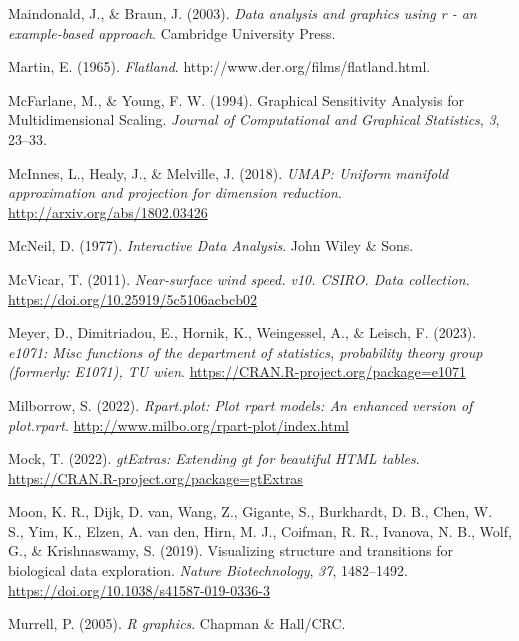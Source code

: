 \documentclass[
  letterpaper,
]{book}
\newlength{\cslhangindent}
\newlength{\cslentryspacingunit} %
\newenvironment{CSLReferences}[2] %
 {%
  \setlength{\parindent}{0pt}
  \ifodd #1
  \let\oldpar\par
  \def\par{\hangindent=\cslhangindent\oldpar}
  \fi
  \setlength{\parskip}{#2\cslentryspacingunit}
 }%
 {}
\begin{document}
\begin{CSLReferences}{1}{0}
\leavevmode{}%
Maindonald, J., \& Braun, J. (2003). \emph{Data analysis and graphics
using r - an example-based approach}. Cambridge University Press.

\leavevmode{}%
Martin, E. (1965). \emph{Flatland}.
http://www.der.org/films/flatland.html.

\leavevmode{}%
McFarlane, M., \& Young, F. W. (1994). Graphical {S}ensitivity
{A}nalysis for {M}ultidimensional {S}caling. \emph{Journal of
Computational and Graphical Statistics}, \emph{3}, 23--33.

\leavevmode{}%
McInnes, L., Healy, J., \& Melville, J. (2018). \emph{{UMAP}: Uniform
manifold approximation and projection for dimension reduction}.
\url{http://arxiv.org/abs/1802.03426}

\leavevmode{}%
McNeil, D. (1977). \emph{Interactive {D}ata {A}nalysis}. John Wiley \&
Sons.

\leavevmode{}%
McVicar, T. (2011). \emph{Near-surface wind speed. v10. CSIRO. Data
collection.} \url{https://doi.org/10.25919/5c5106acbcb02}

\leavevmode{}%
Meyer, D., Dimitriadou, E., Hornik, K., Weingessel, A., \& Leisch, F.
(2023). \emph{e1071: Misc functions of the department of statistics,
probability theory group (formerly: E1071), TU wien}.
\url{https://CRAN.R-project.org/package=e1071}

\leavevmode{}%
Milborrow, S. (2022). \emph{Rpart.plot: Plot rpart models: An enhanced
version of plot.rpart}. \url{http://www.milbo.org/rpart-plot/index.html}

\leavevmode{}%
Mock, T. (2022). \emph{gtExtras: Extending gt for beautiful HTML
tables}. \url{https://CRAN.R-project.org/package=gtExtras}

\leavevmode{}%
Moon, K. R., Dijk, D. van, Wang, Z., Gigante, S., Burkhardt, D. B.,
Chen, W. S., Yim, K., Elzen, A. van den, Hirn, M. J., Coifman, R. R.,
Ivanova, N. B., Wolf, G., \& Krishnaswamy, S. (2019). Visualizing
structure and transitions for biological data exploration. \emph{Nature
Biotechnology}, \emph{37}, 1482--1492.
\url{https://doi.org/10.1038/s41587-019-0336-3}

\leavevmode{}%
Murrell, P. (2005). \emph{R graphics}. Chapman \& Hall/CRC.


\end{CSLReferences}
\end{document}
